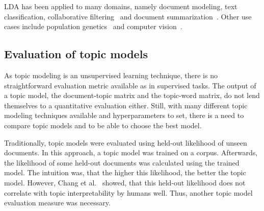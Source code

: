 \documentclass[
        a4paper,
        titlepage,
        twoside,
        parskip
        ]{scrbook}
\theoremstyle{break}
\begin{document}
LDA has been applied to many domains, namely document modeling, text classification, collaborative filtering~\cite{Blei2003} and document summarization~\cite{Wang2009}.
Other use cases include population genetics~\cite{Pritchard2000} and computer vision~\cite{LiFei-Fei2005}.



\subsection{Evaluation of topic models}
\label{sec:evaluation_of_topic_models}
As topic modeling is an unsupervised learning technique, there is no straightforward evaluation metric available as in supervised tasks.
The output of a topic model, the document-topic matrix and the topic-word matrix, do not lend themselves to a quantitative evaluation either.
Still, with many different topic modeling techniques available and hyperparameters to set, there is a need to compare topic models and to be able to choose the best model.

Traditionally, topic models were evaluated using held-out likelihood of unseen documents.
In this approach, a topic model was trained on a corpus.
Afterwards, the likelihood of some held-out documents was calculated using the trained model.
The intuition was, that the higher this likelihood, the better the topic model.
However, Chang et al.~\cite{Chang2009} showed, that this held-out likelihood does not correlate with topic interpretability by humans well.
Thus, another topic model evaluation measure was necessary.
\end{document}
